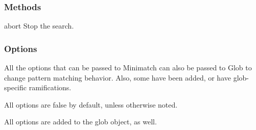 \subsubsection*{Methods}


\begin{DoxyItemize}
\item {\ttfamily abort} Stop the search.
\end{DoxyItemize}

\subsubsection*{Options}

All the options that can be passed to Minimatch can also be passed to Glob to change pattern matching behavior. Also, some have been added, or have glob-\/specific ramifications.

All options are false by default, unless otherwise noted.

All options are added to the glob object, as well.



